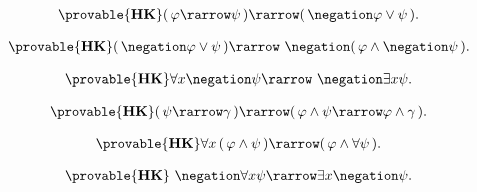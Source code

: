 	\begin{screen}
		\begin{thm}
			\begin{align}
				\provable{\mbox{{\bf HK}}} 
				(\, \varphi \rarrow \psi\, ) 
				\rarrow (\, \negation \varphi \vee \psi\, ).
			\end{align}
		\end{thm}
	\end{screen}
	
	\begin{screen}
		\begin{thm}
			\begin{align}
				\provable{\mbox{{\bf HK}}} 
				(\, \negation \varphi \vee \psi\, ) 
				\rarrow\ \negation (\, \varphi \wedge \negation \psi\, ).
			\end{align}
		\end{thm}
	\end{screen}
	
	\begin{screen}
		\begin{thm}
			\begin{align}
				\provable{\mbox{{\bf HK}}} 
				\forall x \negation \psi \rarrow\ \negation \exists x \psi.
			\end{align}
		\end{thm}
	\end{screen}
	
	\begin{screen}
		\begin{thm}
			\begin{align}
				\provable{\mbox{{\bf HK}}} 
				(\, \psi \rarrow \gamma\, ) \rarrow 
				(\, \varphi \wedge \psi \rarrow \varphi \wedge \gamma\, ).
			\end{align}
		\end{thm}
	\end{screen}
	
	\begin{screen}
		\begin{thm}
			\begin{align}
				\provable{\mbox{{\bf HK}}} 
				\forall x\, (\, \varphi \wedge \psi\, )
				\rarrow (\, \varphi \wedge \forall \psi\, ).
			\end{align}
		\end{thm}
	\end{screen}
	
	\begin{screen}
		\begin{thm}
			\begin{align}
				\provable{\mbox{{\bf HK}}} 
				\ \negation \forall x \psi \rarrow \exists x \negation \psi.
			\end{align}
		\end{thm}
	\end{screen}
	
